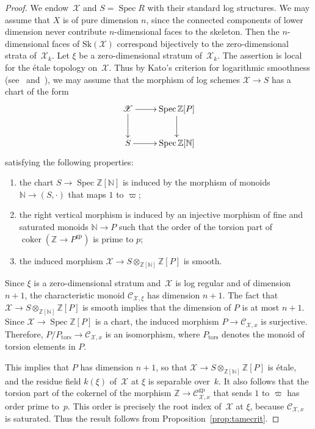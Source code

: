 \documentclass[11pt]{article}
\let\mathcal\mathscr
\theoremstyle{definition}
\numberwithin{equation}{subsection}
\newcommand{\N}{\ensuremath{\mathbb{N}}}
\newcommand{\Z}{\ensuremath{\mathbb{Z}}}
\newcommand{\cX}{\ensuremath{\mathscr{X}}}
\newcommand{\gp}{\mathrm{gp}}
\newcommand{\Sk}{\mathrm{Sk}}
\newcommand{\tors}{\mathrm{tors}}
\DeclareMathOperator{\coker}{coker}
\DeclareMathOperator{\Spec}{Spec}
\let\unif\varpi
\begin{document}
\begin{proof}
We endow~$\cX$ and $S=\Spec R$ with their standard log structures. We may assume that
$X$ is of pure dimension $n$, since the connected components of lower dimension never contribute
$n$-dimensional faces to the skeleton.
Then the $n$-dimensional faces of $\Sk(\cX)$ correspond bijectively to the zero-dimensional strata of~$\cX_k$.
Let $\xi$ be a zero-dimensional stratum of~$\cX_k$.
The assertion is local for the étale topology on~$\cX$. Thus by Kato's criterion for logarithmic smoothness (see~\cite[3.5]{kato-log} and~\cite[4.1]{kato-def}),
we may assume that the morphism of log schemes $\cX\to S$ has a chart of the form
\[
\xymatrix{
\cX\ar[d]\ar[r]& \Spec \Z[P]\ar[d]\\
S\ar[r]& \Spec \Z[\N]
}
\]
satisfying the following properties:
\begin{enumerate}
\item the chart $S\to \Spec \Z[\N]$ is induced by the morphism of monoids $\N\to (S,\cdot)$ that maps $1$ to $\unif$;
\item the right vertical morphism is induced by an injective morphism of fine and saturated monoids $\N\to P$ such that the order of the torsion part of $\coker(\Z\to P^{\gp})$ is prime to $p$;
\item the induced morphism $\cX\to S\otimes_{\Z[\N]}\Z[P]$ is smooth.
\end{enumerate}
Since $\xi$ is a zero-dimensional stratum and~$\cX$ is log regular and of dimension $n+1$, the characteristic monoid
$\mathcal{C}_{\cX,\xi}$ has dimension $n+1$.
The fact that $\cX\to S\otimes_{\Z[\N]}\Z[P]$ is smooth implies that the dimension of $P$ is at most $n+1$.
Since $\cX\to \Spec \Z[P]$ is a chart, the induced morphism
$P\to \mathcal{C}_{\cX,x}$ is surjective.
Therefore, $P/P_{\tors}\to \mathcal{C}_{\cX,x}$ is an isomorphism, where $P_{\tors}$ denotes the monoid of torsion elements in $P$.

This implies that $P$ has dimension $n+1$, so that $\cX\to S\otimes_{\Z[\N]}\Z[P]$ is étale, and the residue field $k(\xi)$ of~$\cX$ at $\xi$ is separable over~$k$.
It also follows that the torsion part of the cokernel of the morphism
$\Z\to \mathcal{C}^{\gp}_{\cX,x}$ that sends $1$ to $\overline{\unif}$ has order prime to~$p$. This order is precisely the root index of~$\cX$ at $\xi$, because $\mathcal{C}_{\cX,x}$ is saturated. Thus the result follows from Proposition~\ref{prop:tamecrit}.
\end{proof}
\end{document}
